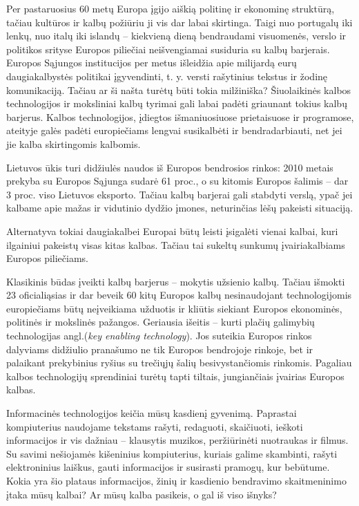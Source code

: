 \begin{multicols}{2}
Per pastaruosius 60 metų Europa įgijo aiškią politinę ir ekonominę struktūrą, tačiau kultūros ir kalbų požiūriu ji vis dar labai skirtinga. Taigi nuo portugalų iki lenkų, nuo italų iki islandų – kiekvieną dieną bendraudami visuomenės, verslo ir politikos srityse Europos piliečiai neišvengiamai susiduria su kalbų barjerais. Europos Sąjungos institucijos per metus išleidžia apie milijardą eurų daugiakalbystės politikai įgyvendinti, t. y. versti rašytinius tekstus ir žodinę komunikaciją. Tačiau ar ši našta turėtų būti tokia milžiniška? Šiuolaikinės kalbos technologijos ir moksliniai kalbų tyrimai gali labai padėti griaunant tokius kalbų barjerus. Kalbos technologijos, įdiegtos išmaniuosiuose prietaisuose ir programose, ateityje galės padėti europiečiams lengvai susikalbėti ir bendradarbiauti, net jei jie kalba skirtingomis kalbomis.

Lietuvos ūkis turi didžiulės naudos iš Europos bendrosios rinkos: 2010 metais prekyba su Europos Sąjunga sudarė 61 proc., o su kitomis Europos šalimis – dar 3 proc. viso Lietuvos eksporto. Tačiau kalbų barjerai gali stabdyti verslą, ypač jei kalbame apie mažas ir vidutinio dydžio įmones, neturinčias lėšų pakeisti situaciją. 

Alternatyva tokiai daugiakalbei Europai būtų leisti įsigalėti vienai kalbai, kuri ilgainiui pakeistų visas kitas kalbas. Tačiau tai sukeltų sunkumų įvairiakalbiams Europos piliečiams. 

Klasikinis būdas įveikti kalbų barjerus – mokytis užsienio kalbų. Tačiau išmokti 23 oficialiąsias ir dar beveik 60 kitų Europos kalbų nesinaudojant technologijomis europiečiams būtų neįveikiama užduotis ir kliūtis siekiant Europos ekonominės, politinės ir mokslinės pažangos.
Geriausia išeitis – kurti plačių galimybių technologijas angl.(\textit{key enabling technology}). Jos suteikia Europos rinkos dalyviams didžiulio pranašumo ne tik Europos bendrojoje rinkoje, bet ir palaikant prekybinius ryšius su trečiųjų šalių besivystančiomis rinkomis. Pagaliau kalbos technologijų sprendiniai turėtų tapti tiltais, jungiančiais įvairias Europos kalbas. 


Informacinės technologijos keičia mūsų kasdienį gyvenimą. Paprastai kompiuterius naudojame tekstams rašyti, redaguoti, skaičiuoti, ieškoti informacijos ir vis dažniau – klausytis muzikos, peržiūrinėti nuotraukas ir filmus. Su savimi nešiojamės kišeninius kompiuterius, kuriais galime skambinti, rašyti elektroninius laiškus, gauti informacijos ir susirasti pramogų, kur bebūtume. Kokia yra šio plataus informacijos, žinių ir kasdienio bendravimo skaitmeninimo įtaka mūsų kalbai? Ar mūsų kalba pasikeis, o gal iš viso išnyks? 


\end{multicols}
